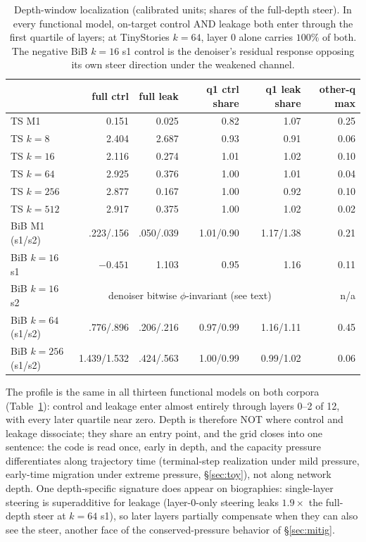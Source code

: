 \documentclass[11pt]{article}
\begin{document}
\begin{table}[h]\centering\small
\begin{tabular}{l rr rr r}
& full ctrl & full leak & q1 ctrl share & q1 leak share & other-q max \\
\hline
TS M1        & 0.151 & 0.025 & 0.82 & 1.07 & 0.25 \\
TS $k{=}8$   & 2.404 & 2.687 & 0.93 & 0.91 & 0.06 \\
TS $k{=}16$  & 2.116 & 0.274 & 1.01 & 1.02 & 0.10 \\
TS $k{=}64$  & 2.925 & 0.376 & 1.00 & 1.01 & 0.04 \\
TS $k{=}256$ & 2.877 & 0.167 & 1.00 & 0.92 & 0.10 \\
TS $k{=}512$ & 2.917 & 0.375 & 1.00 & 1.02 & 0.02 \\
BiB M1 (s1/s2)      & .223/.156 & .050/.039 & 1.01/0.90 & 1.17/1.38 & 0.21 \\
BiB $k{=}16$ s1     & $-0.451$  & 1.103     & 0.95      & 1.16      & 0.11 \\
BiB $k{=}16$ s2     & \multicolumn{4}{c}{denoiser bitwise $\phi$-invariant (see text)} & n/a \\
BiB $k{=}64$ (s1/s2)  & .776/.896   & .206/.216 & 0.97/0.99 & 1.16/1.11 & 0.45 \\
BiB $k{=}256$ (s1/s2) & 1.439/1.532 & .424/.563 & 1.00/0.99 & 0.99/1.02 & 0.06 \\
\end{tabular}
\caption{Depth-window localization (calibrated units; shares of the
full-depth steer). In every functional model, on-target control AND leakage
both enter through the first quartile of layers; at TinyStories $k{=}64$,
layer 0 alone carries $100\%$ of both. The negative BiB $k{=}16$ s1 control
is the denoiser's residual response opposing its own steer direction under
the weakened channel.}
\label{tab:depth}
\end{table}

The profile is the same in all thirteen functional models on both corpora
(Table~\ref{tab:depth}): control and leakage enter almost entirely through
layers 0--2 of 12, with every later quartile near zero. Depth is therefore
NOT where control and leakage dissociate; they share an entry point, and the
grid closes into one sentence: the code is read once, early in depth, and
the capacity pressure differentiates along trajectory time (terminal-step
realization under mild pressure, early-time migration under extreme
pressure, \S\ref{sec:toy}), not along network depth. One depth-specific
signature does appear on biographies: single-layer steering is
superadditive for leakage (layer-0-only steering leaks $1.9\times$ the
full-depth steer at $k{=}64$ s1), so later layers partially compensate when
they can also see the steer, another face of the conserved-pressure
behavior of \S\ref{sec:mitig}.
\end{document}
